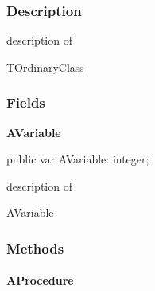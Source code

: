 \documentclass{report}
\newif\ifpdf
\begin{document}
\subsubsection*{\large{\textbf{Description}}\normalsize\hspace{1ex}\hfill}
description of \begin{ttfamily}TOrdinaryClass\end{ttfamily}\subsubsection*{\large{\textbf{Fields}}\normalsize\hspace{1ex}\hfill}
\begin{list}{}{
\setlength{\itemindent}{0cm}
\setlength{\listparindent}{0cm}
\setlength{\leftmargin}{\evensidemargin}
\addtolength{\leftmargin}{\tmplength}
\settowidth{\labelsep}{X}
\addtolength{\leftmargin}{\labelsep}
\setlength{\labelwidth}{\tmplength}
}
\label{ok_abstract_sealed.TOrdinaryClass-AVariable}
\item[\textbf{AVariable}\hfill]
\ifpdf
\begin{flushleft}
\fi
\begin{ttfamily}
public var AVariable: integer;\end{ttfamily}

\ifpdf
\end{flushleft}
\fi


\par description of \begin{ttfamily}AVariable\end{ttfamily}\end{list}
\subsubsection*{\large{\textbf{Methods}}\normalsize\hspace{1ex}\hfill}
\paragraph*{AProcedure}\hspace*{\fill}
\end{document}
